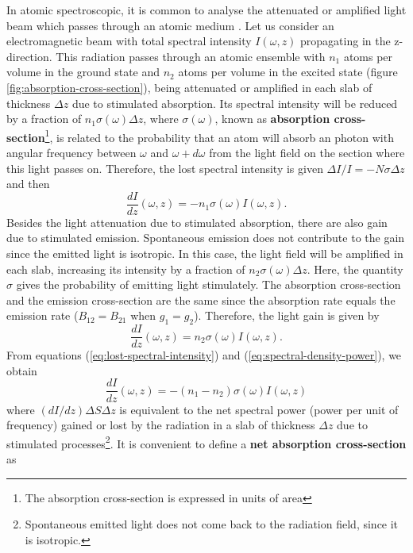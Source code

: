In atomic spectroscopic, it is common to analyse the attenuated or amplified light beam which passes through an atomic medium \cite{reinaudi2007strong, smith2011absorption, shu2004absorption}. Let us consider an electromagnetic beam with total spectral intensity $ I(\omega, z) $ propagating in the z-direction. This radiation passes through an atomic ensemble with $ n_1 $ atoms per volume in the ground state and $ n_2 $ atoms per volume in the excited state (figure \ref{fig:absorption-cross-section}), being attenuated or amplified in each slab of thickness $ \Delta z $ due to stimulated absorption. Its spectral intensity will be reduced by a fraction of $ n_1 \sigma(\omega) \Delta z $, where $ \sigma(\omega) $, known as \textbf{absorption cross-section}\footnote{The absorption cross-section is expressed in units of area}, is related to the probability that an atom will absorb an photon with angular frequency between $ \omega $ and $ \omega + d\omega $ from the light field on the section where this light passes on. Therefore, the lost spectral intensity is given $ \Delta I / I = - N \sigma \Delta z $ and then
\begin{equation}
	\frac{dI}{dz}(\omega, z) = - n_1 \sigma(\omega) I(\omega, z).
	\label{eq:lost-spectral-intensity}
\end{equation}
Besides the light attenuation due to stimulated absorption, there are also gain due to stimulated emission. Spontaneous emission does not contribute to the gain since the emitted light is isotropic. In this case, the light field will be amplified in each slab, increasing its intensity by a fraction of $ n_2 \sigma(\omega) \Delta z $. Here, the quantity $ \sigma $ gives the probability of emitting light stimulately. The absorption cross-section and the emission cross-section are the same since the absorption rate equals the emission rate ($ B_{12} = B_{21} $ when $ g_1 = g_2 $). Therefore, the light gain is given by
\begin{equation}
	\frac{dI}{dz}(\omega, z) = n_2 \sigma(\omega) I(\omega, z).
	\label{eq:spectral-density-power}
\end{equation}
From equations (\ref{eq:lost-spectral-intensity}) and (\ref{eq:spectral-density-power}), we obtain
\begin{equation}
	\frac{dI}{dz}(\omega, z) = - (n_1 - n_2) \sigma(\omega) I(\omega, z)
	\label{eq:net-spectral-density-power}
\end{equation}
where $ (dI / dz) \Delta S \Delta z $ is equivalent to the net spectral power (power per unit of frequency) gained or lost by the radiation in a slab of thickness $ \Delta z $ due to stimulated processes\footnote{Spontaneous emitted light does not come back to the radiation field, since it is isotropic.}. It is convenient to define a \textbf{net absorption cross-section} as 
